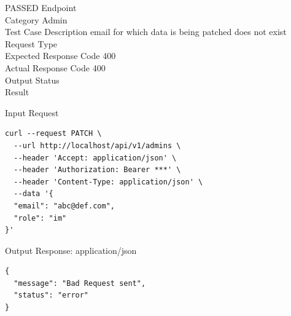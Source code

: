 \begin{testcase}{36}{PASSED}
Endpoint \hfill {}\\
Category \hfill Admin\\
Test Case Description \hfill email for which data is being patched does not exist\\

Request Type    \hfill {}\\
Expected Response Code    \hfill 400\\
Actual Response Code    \hfill 400\\

Output Status \hfill {}\\
Result \hfill {}

\begin{ipblock}{Input Request}
\begin{verbatim}
curl --request PATCH \
  --url http://localhost/api/v1/admins \
  --header 'Accept: application/json' \
  --header 'Authorization: Bearer ***' \
  --header 'Content-Type: application/json' \
  --data '{
  "email": "abc@def.com",
  "role": "im"
}'
\end{verbatim}
\end{ipblock}

\begin{opblock}{Output Response: application/json}
\begin{verbatim}
{
  "message": "Bad Request sent",
  "status": "error"
}
\end{verbatim}
\end{opblock}
\end{testcase}



